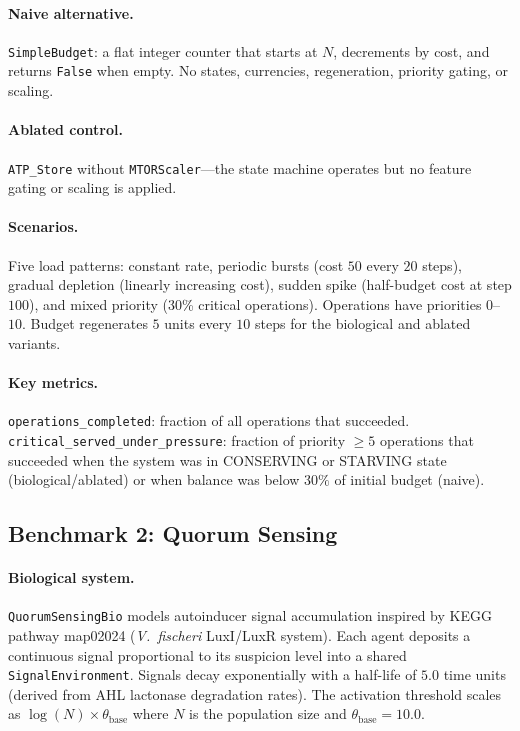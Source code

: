 \paragraph{Naive alternative.}
\texttt{SimpleBudget}: a flat integer counter that starts at $N$,
decrements by cost, and returns \texttt{False} when empty.  No states,
currencies, regeneration, priority gating, or scaling.

\paragraph{Ablated control.}
\texttt{ATP\_Store} without \texttt{MTORScaler}---the state machine
operates but no feature gating or scaling is applied.

\paragraph{Scenarios.}
Five load patterns: constant rate, periodic bursts (cost $50$ every
$20$ steps), gradual depletion (linearly increasing cost), sudden
spike (half-budget cost at step $100$), and mixed priority (30\%
critical operations).  Operations have priorities $0$--$10$.  Budget
regenerates $5$ units every $10$ steps for the biological and ablated
variants.

\paragraph{Key metrics.}
\texttt{operations\_completed}: fraction of all operations that
succeeded.  \texttt{critical\_served\_under\_pressure}: fraction of
priority $\geq 5$ operations that succeeded when the system was in
CONSERVING or STARVING state (biological/ablated) or when balance was
below $30\%$ of initial budget (naive).

\subsection{Benchmark 2: Quorum Sensing}

\paragraph{Biological system.}
\texttt{QuorumSensingBio} models autoinducer signal accumulation
inspired by KEGG pathway map02024 (\emph{V.~fischeri} LuxI/LuxR
system).  Each agent deposits a continuous signal proportional to its
suspicion level into a shared \texttt{SignalEnvironment}.  Signals
decay exponentially with a half-life of $5.0$ time units (derived from
AHL lactonase degradation rates).  The activation threshold scales as
$\log(N) \times \theta_{\text{base}}$ where $N$ is the population size
and $\theta_{\text{base}} = 10.0$.

